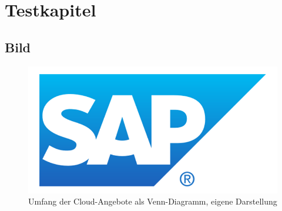 \glsresetall


\seInhaltsverzeichnis[
einrueckung=ja,
gliederungsebenen=4
]




\chapter{Testkapitel}

\section{Bild}

\begin{figure}[h]
\centering
\setlength{\unitlength}{1mm}
\includegraphics[width=15cm]{images/sap-logo.png}
\caption[Umfang der Cloud-Angebote als Venn-Diagramm]{Umfang der Cloud-Angebote als Venn-Diagramm, eigene Darstellung\label{fig:grundlagen:venn}}
\end{figure}

